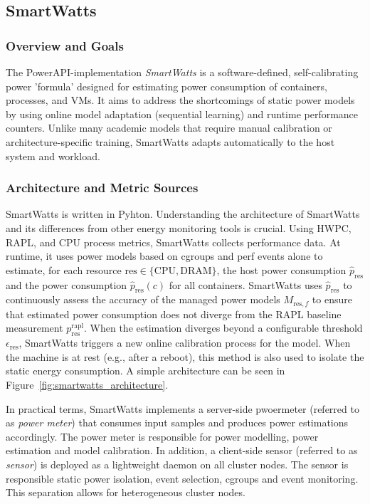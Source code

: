 \subsection{SmartWatts}


\label{sec:smartwatts}
\subsubsection{Overview and Goals}
\label{sec:smartwatts-overview}
The PowerAPI-implementation \textit{SmartWatts}\parencite{fieni2020smartwatts} is a software-defined, self-calibrating power 'formula' designed for estimating power consumption of containers, processes, and VMs. It aims to address the shortcomings of static power models by using online model adaptation (sequential learning) and runtime performance counters. Unlike many academic models that require manual calibration or architecture-specific training, SmartWatts adapts automatically to the host system and workload.
\subsubsection{Architecture and Metric Sources}
\label{sec:smartwatts-architecture}
SmartWatts is written in Pyhton. Understanding the architecture of SmartWatts and its differences from other energy monitoring tools is crucial. Using HWPC, RAPL, and CPU process metrics, SmartWatts collects performance data. At runtime, it uses power models based on cgroups and perf events alone to estimate, for each resource $\text{res} \in \{\text{CPU}, \text{DRAM}\}$, the host power consumption $\hat{p}_{\text{res}}$ and the power consumption $\hat{p}_{\text{res}}(c)$ for all containers. SmartWatts uses $\hat{p}_{\text{res}}$ to continuously assess the accuracy of the managed power models $M_{\text{res}, f}$ to ensure that estimated power consumption does not diverge from the RAPL baseline measurement $p_{\text{res}}^{\text{rapl}}$. When the estimation diverges beyond a configurable threshold $\epsilon_{\text{res}}$, SmartWatts triggers a new online calibration process for the model. When the machine is at rest (e.g., after a reboot), this method is also used to isolate the static energy consumption. A simple architecture can be seen in Figure~\ref{fig:smartwatts_architecture}.

In practical terms, SmartWatts implements a server-side pwoermeter (referred to as \textit{power meter}) that consumes input samples and produces power estimations accordingly. The power meter is responsible for power modelling, power estimation and model calibration. In addition, a client-side sensor (referred to as \textit{sensor}) is deployed as a lightweight daemon on all cluster nodes. The sensor is responsible static power isolation, event selection, cgroups and event monitoring. This separation allows for heterogeneous cluster nodes.


